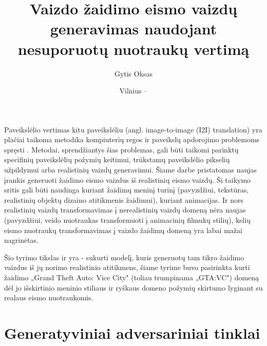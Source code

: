 \documentclass{VUMIFPSkursinis}
\institute{Informatikos institutas}  %
\title{Vaizdo žaidimo eismo vaizdų generavimas naudojant nesuporuotų nuotraukų vertimą}
\author{Gytis Oksas}
\date{Vilnius – \the\year}
\begin{document}
\maketitle

\tableofcontents

    Paveikslėlio vertimas kitu paveikslėliu (angl. image-to-image (I2I) translation) yra plačiai taikoma metodika kompiuterių regos ir paveikslų apdorojimo problemoms spręsti \cite{ImTImTr}. Metodai, sprendžiantys šias problemas, gali būti taikomi parinktų specifinių paveikslėlių požymių keitimui, trūkstamų paveikslėlio pikselių užpildymui arba realistinių vaizdų generavimui. Šiame darbe pristatomas naujas įrankis generuoti žaidimo eismo vaizdus iš realistinių eismo vaizdų. Ši taikymo sritis gali būti naudinga kuriant žaidimų meninį turinį (pavyzdžiui, tekstūras, realistinių objektų dizaino atitikmenis žaidimui), kuriant animacijas. Ir nors realistinių vaizdų transformavimas į nerealistinių vaizdų domeną nėra naujas (pavyzdžiui, veido nuotraukas transformuoti į animacinių filmukų stilių), kelių eismo nuotraukų transformavimas į vaizdo žaidimų domeną yra labai mažai nagrinėtas.
    
    Šio tyrimo tikslas ir yra - sukurti modelį, kuris generuotų tam tikro žaidimo vaizdus iš jų norimo realistinio atitikmens, šiame tyrime buvo pasirinkta kurti žaidimo „Grand Theft Auto: Vice City" (toliau trumpinama „GTA:VC") domeną dėl jo išskirtinio meninio stiliaus ir ryškaus domeno požymių skirtumo lyginant su realaus eismo nuotraukomis.
\section{Generatyviniai adversariniai tinklai}
\end{document}
